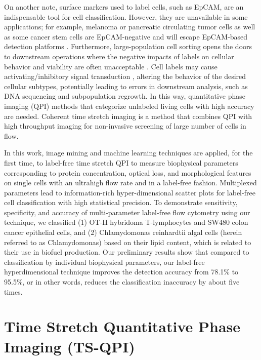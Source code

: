 \documentclass[aps,pra,reprint,superscriptaddress]{revtex4-1}
\begin{document}
On another note, surface markers used to label cells, such as EpCAM, are an indispensable tool for cell classification. However, they are unavailable in some applications; for example, melanoma or pancreatic circulating tumor cells as well as some cancer stem cells are EpCAM-negative and will escape EpCAM-based detection platforms \cite{kling2012beyond}. Furthermore, large-population cell sorting opens the doors to downstream operations where the negative impacts of labels on cellular behavior and viability are often unacceptable \cite{}. Cell labels may cause activating/inhibitory signal transduction \cite{}, altering the behavior of the desired cellular subtypes, potentially leading to errors in downstream analysis, such as DNA sequencing and subpopulation regrowth. In this way, quantitative phase imaging (QPI) methods \cite{ikeda2005hilbert,popescu2011quantitative,pham2013real} that categorize unlabeled living cells with high accuracy are needed. Coherent time stretch imaging is a method that combines QPI with high throughput imaging for non-invasive screening of large number of cells in flow.

In this work, image mining and machine learning techniques are applied, for the first time, to label-free time stretch QPI to measure biophysical parameters corresponding to protein concentration, optical loss, and morphological features on single cells with an ultrahigh flow rate and in a label-free fashion. Multiplexed parameters lead to information-rich hyper-dimensional scatter plots for label-free cell classification with high statistical precision. To demonstrate sensitivity, specificity, and accuracy of multi-parameter label-free flow cytometry using our technique, we classified (1) OT-II hybridoma T-lymphocytes and SW480 colon cancer epithelial cells, and (2) Chlamydomonas reinhardtii algal cells (herein referred to as Chlamydomonas) based on their lipid content, which is related to their use in biofuel production. Our preliminary results show that compared to classification by individual biophysical parameters, our label-free hyperdimensional technique improves the detection accuracy from 78.1\% to 95.5\%, or in other words, reduces the classification inaccuracy by about five times. 

\section{Time Stretch Quantitative Phase Imaging (TS-QPI)}
\end{document}

